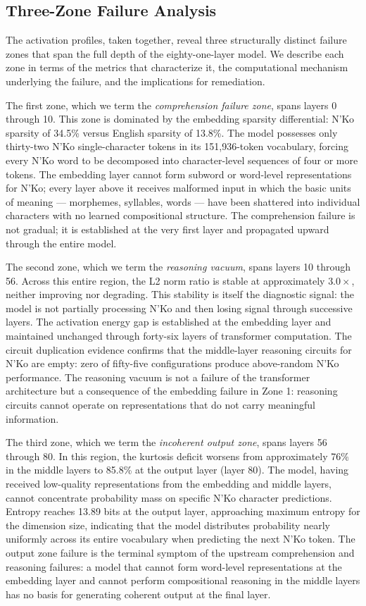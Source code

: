 \documentclass[11pt]{article}
\newcommand{\nko}{N'Ko}
\begin{document}
\subsection{Three-Zone Failure Analysis}
\label{sec:three_zone}

The activation profiles, taken together, reveal three structurally distinct failure zones that span the full depth of the eighty-one-layer model. We describe each zone in terms of the metrics that characterize it, the computational mechanism underlying the failure, and the implications for remediation.

The first zone, which we term the \emph{comprehension failure zone}, spans layers 0 through 10. This zone is dominated by the embedding sparsity differential: \nko{} sparsity of 34.5\% versus English sparsity of 13.8\%. The model possesses only thirty-two \nko{} single-character tokens in its 151,936-token vocabulary, forcing every \nko{} word to be decomposed into character-level sequences of four or more tokens. The embedding layer cannot form subword or word-level representations for \nko{}; every layer above it receives malformed input in which the basic units of meaning --- morphemes, syllables, words --- have been shattered into individual characters with no learned compositional structure. The comprehension failure is not gradual; it is established at the very first layer and propagated upward through the entire model.

The second zone, which we term the \emph{reasoning vacuum}, spans layers 10 through 56. Across this entire region, the L2 norm ratio is stable at approximately $3.0\times$, neither improving nor degrading. This stability is itself the diagnostic signal: the model is not partially processing \nko{} and then losing signal through successive layers. The activation energy gap is established at the embedding layer and maintained unchanged through forty-six layers of transformer computation. The circuit duplication evidence confirms that the middle-layer reasoning circuits for \nko{} are empty: zero of fifty-five configurations produce above-random \nko{} performance. The reasoning vacuum is not a failure of the transformer architecture but a consequence of the embedding failure in Zone 1: reasoning circuits cannot operate on representations that do not carry meaningful information.

The third zone, which we term the \emph{incoherent output zone}, spans layers 56 through 80. In this region, the kurtosis deficit worsens from approximately 76\% in the middle layers to 85.8\% at the output layer (layer 80). The model, having received low-quality representations from the embedding and middle layers, cannot concentrate probability mass on specific \nko{} character predictions. Entropy reaches 13.89 bits at the output layer, approaching maximum entropy for the dimension size, indicating that the model distributes probability nearly uniformly across its entire vocabulary when predicting the next \nko{} token. The output zone failure is the terminal symptom of the upstream comprehension and reasoning failures: a model that cannot form word-level representations at the embedding layer and cannot perform compositional reasoning in the middle layers has no basis for generating coherent output at the final layer.
\end{document}
